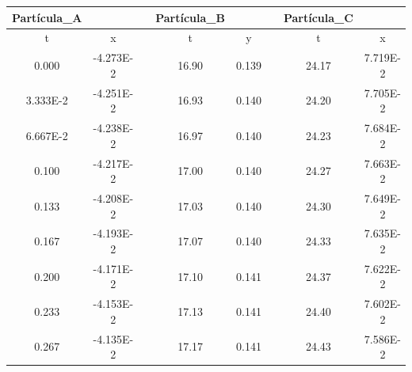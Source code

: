 \documentclass[article,12pt]{elsarticle}
\begin{document}
\begin{longtable}[c]{|c|c|cccccc}
\hline
Partícula\_A  &           & \multicolumn{1}{c|}{} & \multicolumn{1}{c|}{Partícula\_B} & \multicolumn{1}{c|}{}      & \multicolumn{1}{c|}{} & \multicolumn{1}{c|}{Partícula\_C} & \multicolumn{1}{c|}{}         \\ \hline
\endfirsthead
%
\endhead
%
t        & x         & \multicolumn{1}{c|}{} & \multicolumn{1}{c|}{t}       & \multicolumn{1}{c|}{y}     & \multicolumn{1}{c|}{} & \multicolumn{1}{c|}{t}       & \multicolumn{1}{c|}{x}        \\ \hline
0.000    & -4.273E-2 & \multicolumn{1}{c|}{} & \multicolumn{1}{c|}{16.90}   & \multicolumn{1}{c|}{0.139} & \multicolumn{1}{c|}{} & \multicolumn{1}{c|}{24.17}   & \multicolumn{1}{c|}{7.719E-2} \\ \hline
3.333E-2 & -4.251E-2 & \multicolumn{1}{c|}{} & \multicolumn{1}{c|}{16.93}   & \multicolumn{1}{c|}{0.140} & \multicolumn{1}{c|}{} & \multicolumn{1}{c|}{24.20}   & \multicolumn{1}{c|}{7.705E-2} \\ \hline
6.667E-2 & -4.238E-2 & \multicolumn{1}{c|}{} & \multicolumn{1}{c|}{16.97}   & \multicolumn{1}{c|}{0.140} & \multicolumn{1}{c|}{} & \multicolumn{1}{c|}{24.23}   & \multicolumn{1}{c|}{7.684E-2} \\ \hline
0.100    & -4.217E-2 & \multicolumn{1}{c|}{} & \multicolumn{1}{c|}{17.00}   & \multicolumn{1}{c|}{0.140} & \multicolumn{1}{c|}{} & \multicolumn{1}{c|}{24.27}   & \multicolumn{1}{c|}{7.663E-2} \\ \hline
0.133    & -4.208E-2 & \multicolumn{1}{c|}{} & \multicolumn{1}{c|}{17.03}   & \multicolumn{1}{c|}{0.140} & \multicolumn{1}{c|}{} & \multicolumn{1}{c|}{24.30}   & \multicolumn{1}{c|}{7.649E-2} \\ \hline
0.167    & -4.193E-2 & \multicolumn{1}{c|}{} & \multicolumn{1}{c|}{17.07}   & \multicolumn{1}{c|}{0.140} & \multicolumn{1}{c|}{} & \multicolumn{1}{c|}{24.33}   & \multicolumn{1}{c|}{7.635E-2} \\ \hline
0.200    & -4.171E-2 & \multicolumn{1}{c|}{} & \multicolumn{1}{c|}{17.10}   & \multicolumn{1}{c|}{0.141} & \multicolumn{1}{c|}{} & \multicolumn{1}{c|}{24.37}   & \multicolumn{1}{c|}{7.622E-2} \\ \hline
0.233    & -4.153E-2 & \multicolumn{1}{c|}{} & \multicolumn{1}{c|}{17.13}   & \multicolumn{1}{c|}{0.141} & \multicolumn{1}{c|}{} & \multicolumn{1}{c|}{24.40}   & \multicolumn{1}{c|}{7.602E-2} \\ \hline
0.267    & -4.135E-2 & \multicolumn{1}{c|}{} & \multicolumn{1}{c|}{17.17}   & \multicolumn{1}{c|}{0.141} & \multicolumn{1}{c|}{} & \multicolumn{1}{c|}{24.43}   & \multicolumn{1}{c|}{7.586E-2} \\ \hline

\end{longtable}
\end{document}
